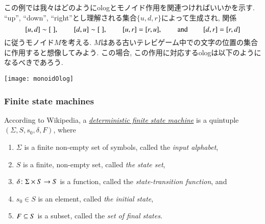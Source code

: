 \begin{example}\label{ex:monoid as olog}


この例では我々はどのようにologとモノイド作用を関連つければいいかを示す. ``up'', ``down'', ``right''とし理解される集合$\{u,d,r\}$によって生成され, 関係$$[u,d]\sim[\;],\hsp[d,u]\sim[\;],\hsp[u,r]=[r,u],\hsp \tn{and}\hsp [d,r]=[r,d]$$に従うモノイド$M$を考える.
$M$はある古いテレビゲーム中での文字の位置の集合に作用すると想像してみよう. この場合, この作用に対応するologは以下のようになるべきであろう.
\begin{center}
\texttt{[image: monoidOlog]}
\end{center}

\end{example}


\subsubsection{Finite state machines}\label{sec:FSMs}

According to Wikipedia, a \href{http://en.wikipedia.org/wiki/Finite_state_machine#Mathematical_model}{\em deterministic finite state machine} is a quintuple $(\Sigma,S,s_0,\delta,F)$, where
\begin{enumerate}
\item $\Sigma$ is a finite non-empty set of symbols, called the {\em input alphabet},
\item $S$ is a finite, non-empty set, called {\em the state set},
\item $\delta\taking \Sigma\times S\to S$ is a function, called the {\em state-transition function}, and
\item $s_0\in S$ is an element, called {\em the initial state},
\item $F\ss S$ is a subset, called the {\em set of final states}.
\end{enumerate}

